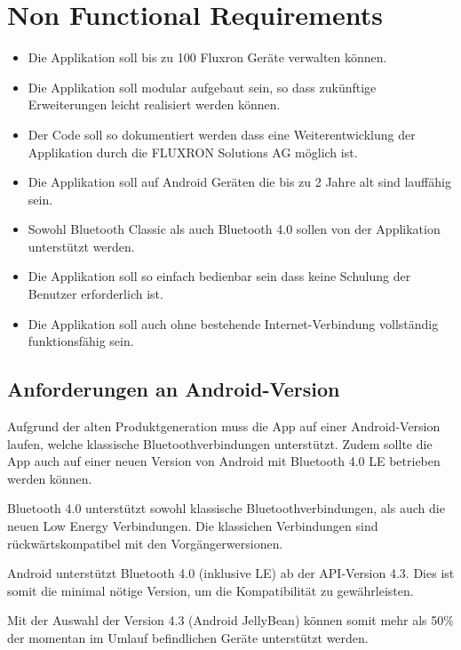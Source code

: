 
\section{Non Functional Requirements}
\label{sec:Non Functional Requirements}

\begin{itemize}
\item Die Applikation soll bis zu 100 Fluxron Geräte verwalten können.
\item Die Applikation soll modular aufgebaut sein, so dass zukünftige Erweiterungen leicht realisiert werden können.
\item Der Code soll so dokumentiert werden dass eine Weiterentwicklung der Applikation durch die FLUXRON Solutions AG möglich ist.
\item Die Applikation soll auf Android Geräten die bis zu 2 Jahre alt sind lauffähig sein.
\item Sowohl Bluetooth Classic als auch Bluetooth 4.0 sollen von der Applikation unterstützt werden.
\item Die Applikation soll so einfach bedienbar sein dass keine Schulung der Benutzer erforderlich ist.
\item Die Applikation soll auch ohne bestehende Internet-Verbindung vollständig funktionsfähig sein.
\end{itemize}


\subsection{Anforderungen an Android-Version}
\label{subsec:Non Functional Requirements}
Aufgrund der alten Produktgeneration muss die App auf einer Android-Version laufen, welche klassische Bluetoothverbindungen unterstützt. Zudem sollte die App auch auf einer neuen Version von Android mit Bluetooth 4.0 \ac{LE} betrieben werden können.

Bluetooth 4.0 unterstützt sowohl klassische Bluetoothverbindungen, als auch die neuen Low Energy Verbindungen. Die klassichen Verbindungen sind rückwärtskompatibel mit den Vorgängerwersionen.\cite{bt_standard}

Android unterstützt Bluetooth 4.0 (inklusive \ac{LE}) ab der API-Version 4.3\cite{bt_android}. Dies ist somit die minimal nötige Version, um die Kompatibilität zu gewährleisten.

Mit der Auswahl der Version 4.3 (Android JellyBean) können somit mehr als 50\% der momentan im Umlauf \cite{android_distribution} befindlichen Geräte unterstützt werden.